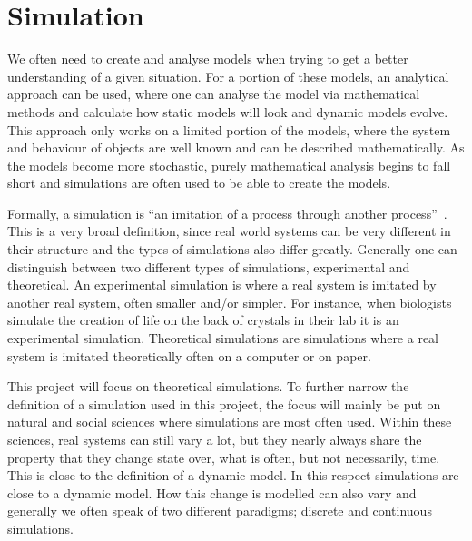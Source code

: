 \section{Simulation}
We often need to create and analyse models when trying to get a better understanding of a given situation. For a portion of these models, an analytical approach can be used, where one can analyse the model via mathematical methods and calculate how static models will look and dynamic models evolve. This approach only works on a limited portion of the models, where the system and behaviour of objects are well known and can be described mathematically. As the models become more stochastic, purely mathematical analysis begins to fall short and simulations are often used to be able to create the models.

Formally, a simulation is \enquote{an imitation of a process through another process}~\cite{hegselmann1996modelling}. This is a very broad definition, since real world systems can be very different in their structure and the types of simulations also differ greatly. Generally one can distinguish between two different types of simulations, experimental and theoretical. An experimental simulation is where a real system is imitated by another real system, often smaller and/or simpler. For instance, when biologists simulate the creation of life on the back of crystals in their lab it is an experimental simulation. Theoretical simulations are simulations where a real system is imitated theoretically often on a computer or on paper. 

This project will focus on theoretical simulations. To further narrow the definition of a simulation used in this project, the focus will mainly be put on natural and social sciences where simulations are most often used. Within these sciences, real systems can still vary a lot, but they nearly always share the property that they change state over, what is often, but not necessarily, time. This is close to the definition of a dynamic model. In this respect simulations are close to a dynamic model. How this change is modelled can also vary and generally we often speak of two different paradigms; discrete and continuous simulations.

